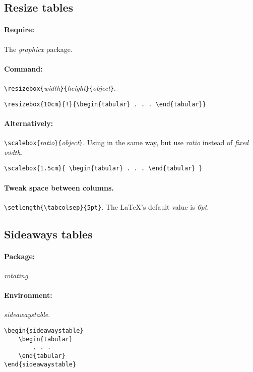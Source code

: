 \subsection{Resize tables}

\paragraph{Require:} The \emph{graphicx} package.
\paragraph{Command:} \verb|\resizebox{|\emph{width}\verb|}{|\emph{height}\verb|}{|\emph{object}\verb|}|.
\begin{verbatim}
\resizebox{10cm}{!}{\begin{tabular} . . . \end{tabular}}
\end{verbatim}
\paragraph{Alternatively:} \verb|\scalebox{|\emph{ratio}\verb|}{|\emph{object}\verb|}|. Using in the same way, but use \emph{ratio}
instead of \emph{fixed width}.
\begin{verbatim}
\scalebox{1.5cm}{ \begin{tabular} . . . \end{tabular} }
\end{verbatim}

\paragraph{Tweak space between columns.} \verb|\setlength{\tabcolsep}{5pt}|. The \LaTeX{}'s default value is \emph{6pt}.

\subsection{Sideaways tables}
\paragraph{Package:} \emph{rotating}.
\paragraph{Environment:} \emph{sideawaystable}.
\begin{verbatim}
\begin{sideawaystable}
	\begin{tabular}
		. . .
	\end{tabular}
\end{sideawaystable}
\end{verbatim}
